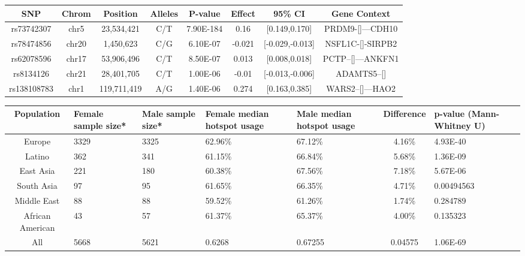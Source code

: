 \clearpage 

\begin{table}[!h] \centering
    \footnotesize
    \begin{tabular}{|cccccccc|}
        \hline 
SNP & Chrom & Position & Alleles & P-value & Effect & 95\% CI & Gene Context \\ \hline
rs73742307 & chr5 & 23,534,421 & C/T & 7.90E-184 & 0.16 & [0.149,0.170] & PRDM9-[]---CDH10 \\
rs78474856 & chr20 & 1,450,623 & C/G & 6.10E-07 & -0.021 & [-0.029,-0.013] & NSFL1C-[]-SIRPB2 \\
rs62078596 & chr17 & 53,906,496 & C/T & 8.50E-07 & 0.013 & [0.008,0.018] & PCTP--[]---ANKFN1 \\
rs8134126 & chr21 & 28,401,705 & C/T & 1.00E-06 & -0.01 & [-0.013,-0.006] & ADAMTS5--[] \\
rs138108783 & chr1 & 119,711,419 & A/G & 1.40E-06 & 0.274 & [0.163,0.385] & WARS2--[]---HAO2 \\
    \hline \end{tabular}
\end{table}

\begin{table}[!h] \centering
    \begin{tabular}{|cp{1.5cm}p{1.5cm}p{1.5cm}p{1.5cm}cp{2cm}|}
        \hline 
        Population & Female sample size* & Male sample size* & Female median hotspot usage & Male median hotspot usage & Difference & p-value (Mann-Whitney U) \\ \hline
        Europe & 3329 & 3325 & 62.96\% & 67.12\% & 4.16\% & 4.93E-40 \\
        Latino & 362 & 341 & 61.15\% & 66.84\% & 5.68\% & 1.36E-09 \\
        East Asia & 221 & 180 & 60.38\% & 67.56\% & 7.18\% & 5.67E-06 \\
        South Asia & 97 & 95 & 61.65\% & 66.35\% & 4.71\% & 0.00494563 \\
        Middle East & 88 & 88 & 59.52\% & 61.26\% & 1.74\% & 0.284789 \\
        African American & 43 & 57 & 61.37\% & 65.37\% & 4.00\% & 0.135323 \\
        \hline All & 5668 & 5621 & 0.6268 & 0.67255 & 0.04575 & 1.06E-69 \\
    \hline \end{tabular}
\end{table}

